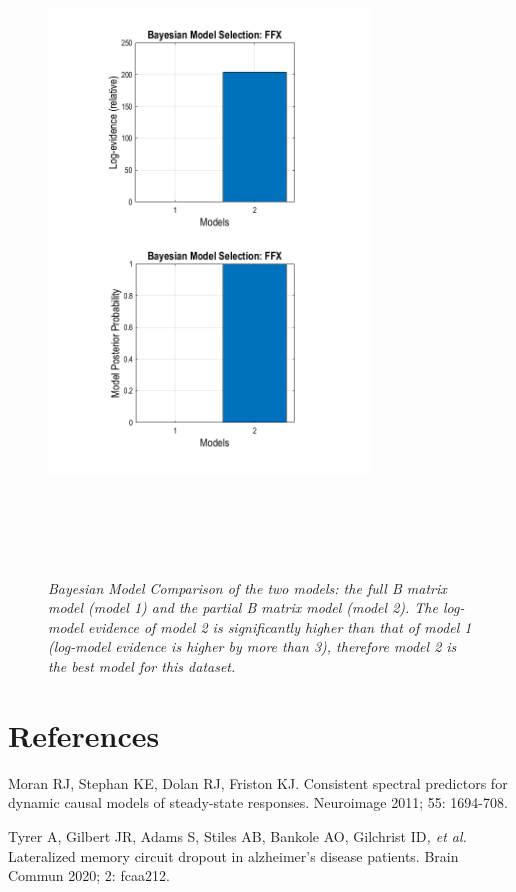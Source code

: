 \begin{figure}
\begin{center}
\includegraphics[width=3.36083in,height=6.93814in]{dcm_erp/figures/BMC.png}
\caption{\em Bayesian Model Comparison of the two models: the full B
matrix model (model 1) and the partial B matrix model (model 2). The
log-model evidence of model 2 is significantly higher than that of model
1 (log-model evidence is higher by more than 3), therefore model 2 is
the best model for this dataset.\label{dcm-erp:fig:5}}
\end{center}
\end{figure}

\section{References}

Moran RJ, Stephan KE, Dolan RJ, Friston KJ. Consistent spectral
predictors for dynamic causal models of steady-state responses.
Neuroimage 2011; 55: 1694-708.

Tyrer A, Gilbert JR, Adams S, Stiles AB, Bankole AO, Gilchrist ID\emph{,
et al.} Lateralized memory circuit dropout in alzheimer's disease
patients. Brain Commun 2020; 2: fcaa212.
